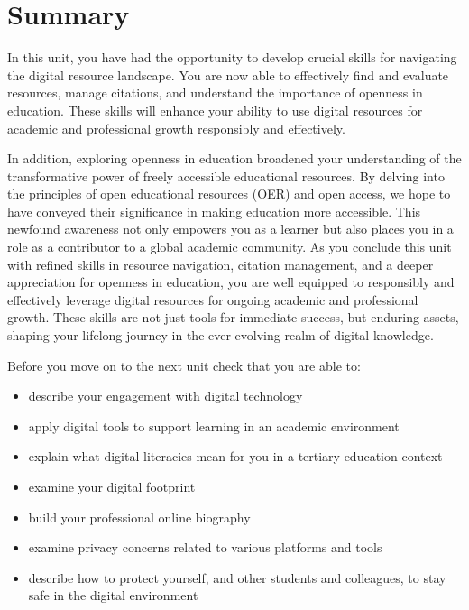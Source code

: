 \documentclass[
  letterpaper,
  DIV=11,
  numbers=noendperiod]{scrreprt}
\providecommand{\tightlist}{%
  \setlength{\itemsep}{0pt}\setlength{\parskip}{0pt}}\usepackage{longtable,booktabs,array}
\begin{document}
\section*{Summary}\label{summary-1}


In this unit, you have had the opportunity to develop crucial skills for
navigating the digital resource landscape. You are now able to
effectively find and evaluate resources, manage citations, and
understand the importance of openness in education. These skills will
enhance your ability to use digital resources for academic and
professional growth responsibly and effectively.

In addition, exploring openness in education broadened your
understanding of the transformative power of freely accessible
educational resources. By delving into the principles of open
educational resources (OER) and open access, we hope to have conveyed
their significance in making education more accessible. This newfound
awareness not only empowers you as a learner but also places you in a
role as a contributor to a global academic community. As you conclude
this unit with refined skills in resource navigation, citation
management, and a deeper appreciation for openness in education, you are
well equipped to responsibly and effectively leverage digital resources
for ongoing academic and professional growth. These skills are not just
tools for immediate success, but enduring assets, shaping your lifelong
journey in the ever evolving realm of digital knowledge.

\begin{tcolorbox}[enhanced jigsaw, toprule=.15mm, colback=white, colframe=quarto-callout-note-color-frame, bottomtitle=1mm, leftrule=.75mm, coltitle=black, titlerule=0mm, rightrule=.15mm, colbacktitle=quarto-callout-note-color!10!white, left=2mm, title={Checking Your Learning}, opacitybacktitle=0.6, opacityback=0, breakable, toptitle=1mm, arc=.35mm, bottomrule=.15mm]

Before you move on to the next unit check that you are able to:

\begin{itemize}
\tightlist
\item
  describe your engagement with digital technology
\item
  apply digital tools to support learning in an academic environment
\item
  explain what digital literacies mean for you in a tertiary education
  context
\item
  examine your digital footprint
\item
  build your professional online biography
\item
  examine privacy concerns related to various platforms and tools
\item
  describe how to protect yourself, and other students and colleagues,
  to stay safe in the digital environment
\end{itemize}

\end{tcolorbox}
\end{document}
